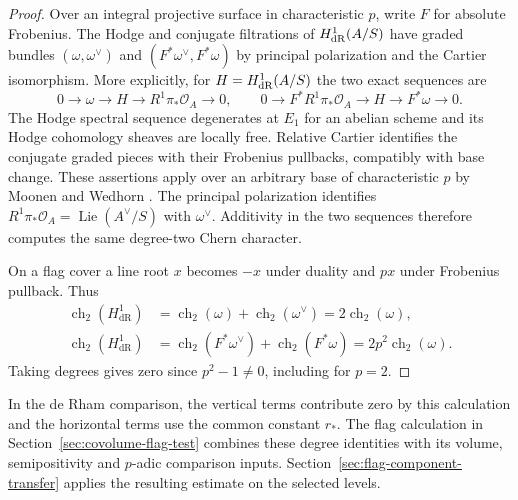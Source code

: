 \begin{proof}
Over an integral projective surface in characteristic
\(p\), write \(F\) for absolute Frobenius. The Hodge and
conjugate filtrations of \(H^1_{\rm dR}(A/S)\) have graded
bundles \((\omega,\omega^\vee)\) and
\((F^*\omega^\vee,F^*\omega)\) by principal polarization and
the Cartier isomorphism. More explicitly, for \(H=H^1_{\rm dR}(A/S)\) the two exact sequences are
\[
 0\to\omega\to H\to R^1\pi_*\mathcal O_A\to0,\qquad
 0\to F^*R^1\pi_*\mathcal O_A\to H\to F^*\omega\to0.
\]
The Hodge spectral sequence degenerates at \(E_1\) for an abelian scheme and its Hodge cohomology sheaves are locally free. Relative Cartier identifies the conjugate graded pieces with their Frobenius pullbacks, compatibly with base change. These assertions apply over an arbitrary base of characteristic \(p\) by Moonen and Wedhorn \cite[\S\S6.2--6.5, Example~6.4(1)]{moonen-wedhorn-fzip}. The principal polarization identifies \(R^1\pi_*\mathcal O_A=\operatorname{Lie}(A^\vee/S)\) with \(\omega^\vee\). Additivity in the two sequences therefore computes the same degree-two Chern character. 

On a flag
cover a line root \(x\) becomes \(-x\) under duality and \(px\)
under Frobenius pullback. Thus
\[
 \begin{aligned}
 \operatorname{ch}_2(H^1_{\mathrm{dR}})
   &=\operatorname{ch}_2(\omega)+\operatorname{ch}_2(\omega^\vee)
    =2\operatorname{ch}_2(\omega),\\
 \operatorname{ch}_2(H^1_{\mathrm{dR}})
   &=\operatorname{ch}_2(F^*\omega^\vee)+\operatorname{ch}_2(F^*\omega)
    =2p^2\operatorname{ch}_2(\omega).
 \end{aligned}
\]
Taking degrees gives zero since \(p^2-1\ne0\), including for
\(p=2\).
\end{proof}

In the de Rham comparison, the vertical terms contribute zero by this calculation and the horizontal terms use the common constant \(r_*\). The flag calculation in
Section~\ref{sec:covolume-flag-test} combines these degree
identities with its volume, semipositivity and \(p\)-adic
comparison inputs. Section~\ref{sec:flag-component-transfer}
applies the resulting estimate on the selected levels.
\label{cor:hodge-surface-degree-8}
